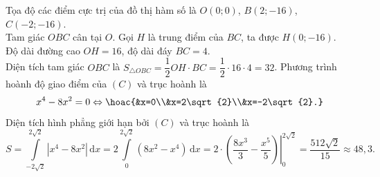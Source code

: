 \begin{ex}
{\begin{itemchoice}
\begin{center}
\begin{tikzpicture}[x=1cm,y=0.15cm,declare function={f (\x)=(\x)^4-8*(\x)^2;},line join=round,line cap=round,>=stealth,scale=1]
				\end{tikzpicture}
			\end{center}
			Tọa độ các điểm cực trị của đồ thị hàm số là $O(0;0)$, $B(2;-16)$, $C(-2;-16)$.\\
			Tam giác $OBC$ cân tại $O$. Gọi $H$ là trung điểm của $BC$, ta được $H(0;-16)$.\\
			Độ dài đường cao $OH=16$, độ dài đáy $BC=4$.\\
			Diện tích tam giác $OBC$ là $S_{\triangle OBC}=\dfrac{1}{2}OH\cdot BC=\dfrac{1}{2}\cdot16\cdot4=32$.
			\itemch Phương trình hoành độ giao điểm của $(C)$ và trục hoành là
			\[x^4-8x^2=0\Leftrightarrow\hoac{&x=0\\&x=2\sqrt{2}\\&x=-2\sqrt{2}.}\]
			Diện tích hình phẳng giới hạn bởi $(C)$ và trục hoành là
			\[S=\displaystyle\int\limits_{-2\sqrt{2}}^{2\sqrt{2}}\left|x^4-8x^2\right|\mathrm{\,d}x=2\displaystyle\int\limits_{0}^{2\sqrt{2}}\left(8x^2-x^4\right)\mathrm{\,d}x=\left.2\cdot\left(\dfrac{8x^3}{3}-\dfrac{x^5}{5}\right)\right|_{0}^{2\sqrt{2}}=\dfrac{512\sqrt{2}}{15}\approx48{,}3.\]
		\end{itemchoice}
	}
\end{ex}

